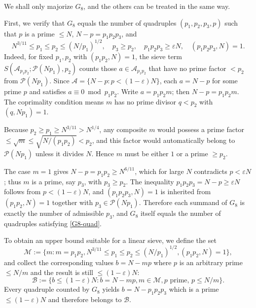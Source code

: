 \documentclass[12pt, a4paper]{amsart}
\def\le{\leqslant}
\def\ge{\geqslant}
\theoremstyle{plain}
\theoremstyle{remark}
\numberwithin{equation}{section}
\begin{document}
We shall only majorize  $G_8$, and the others can be treated in the same way. 

First, we verify that \(G_8\) equals the number of quadruples \((p_1,p_2,p_3,p)\) such that  
\(p\) is a prime \(\le N\),  
\(N-p = p_1p_2p_3\), and  
\begin{equation}\label{G8-quad}
N^{3/11} \le p_1 \le p_2 \le (N/p_1)^{1/2},\quad p_3 \ge p_2,\quad p_1p_2p_3\ge \varepsilon N,\quad (p_1p_2p_3, N) = 1.
\end{equation}
Indeed, for fixed \(p_1,p_2\) with \((p_1p_2,N)=1\), the sieve term  
\(S(\mathscr{A}_{p_1p_2}; \mathscr{P}(N p_1), p_2)\) counts those \(a\in\mathscr{A}_{p_1p_2}\) that have no prime factor \(<p_2\) from \(\mathscr{P}(N p_1)\).  
Since \(\mathscr{A}=\{N-p:p<(1-\varepsilon)N\}\), each \(a=N-p\) for some prime \(p\) 
and satisfies \(a \equiv 0 \bmod {p_1p_2}\). Write \(a=p_1p_2m\); then \(N-p=p_1p_2m\).  
The coprimality condition means \(m\) has no prime divisor \(q<p_2\) with \((q,Np_1)=1\).  

Because $p_2\ge p_1\ge N^{3/11}>N^{1/4}$,
any composite $m$ would possess a prime factor
$\le\sqrt{m}\le\sqrt{N/(p_1p_2)}<p_2$,
and this factor would automatically belong to $\mathscr{P}(N p_1)$
unless it divides $N$.
Hence $m$ must be either $1$ or a prime $\ge p_2$.

The case $m=1$ gives $N-p=p_1p_2\ge N^{6/11}$,
which for large $N$ contradicts $p<\varepsilon N$;
thus $m$ is a prime, say $p_3$, with $p_3\ge p_2$.
The inequality $p_1p_2p_3=N-p\ge\varepsilon N$ follows from $p<(1-\varepsilon)N$,
and $(p_1p_2p_3,N)=1$ is inherited from $(p_1p_2,N)=1$ together with
$p_3\in\mathscr{P}(N p_1)$.
Therefore each summand of $G_8$ is exactly the number of admissible $p_3$,
and $G_8$ itself equals the number of quadruples satisfying \eqref{G8-quad}.

To obtain an upper bound suitable for a linear sieve, we define the set 
\begin{equation}
\mathscr{M}:= \{ m : m = p_1p_2, N^{3/11} \le p_1 \le p_2 \le (N/p_1)^{1/2}, (p_1p_2, N) = 1 \},
\end{equation}
and collect the corresponding values $b=N-mp$ where $p$ is an arbitrary prime
$\le N/m$ and the result is still $\le(1-\varepsilon)N$:
\begin{equation}
\mathscr{B}:= \{ b\le (1-\varepsilon) N : b = N - mp, m \in \mathscr{M}, p \text{ prime, } p \le N/m \}.
\end{equation}
Every quadruple counted by $G_8$ yields $b=N-p_1p_2p_3$ which is a prime
$\le (1-\varepsilon)N$ and therefore belongs to $\mathscr{B}$.
\end{document}
